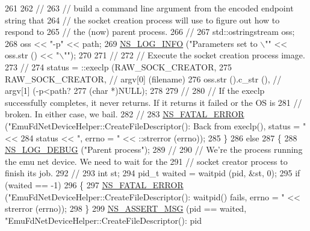 \begin{DoxyCode}
261 
262       \textcolor{comment}{//}
263       \textcolor{comment}{// build a command line argument from the encoded endpoint string that}
264       \textcolor{comment}{// the socket creation process will use to figure out how to respond to}
265       \textcolor{comment}{// the (now) parent process.}
266       \textcolor{comment}{//}
267       std::ostringstream oss;
268       oss << \textcolor{stringliteral}{"-p"} << path;
269       \hyperlink{group__logging_gafbd73ee2cf9f26b319f49086d8e860fb}{NS\_LOG\_INFO} (\textcolor{stringliteral}{"Parameters set to \(\backslash\)""} << oss.str () << \textcolor{stringliteral}{"\(\backslash\)""});
270 
271       \textcolor{comment}{//}
272       \textcolor{comment}{// Execute the socket creation process image.}
273       \textcolor{comment}{//}
274       status = ::execlp (RAW\_SOCK\_CREATOR,
275                          RAW\_SOCK\_CREATOR,                            \textcolor{comment}{// argv[0] (filename)}
276                          oss.str ().c\_str (),                           \textcolor{comment}{// argv[1] (-p<path?}
277                          (\textcolor{keywordtype}{char} *)NULL);
278 
279       \textcolor{comment}{//}
280       \textcolor{comment}{// If the execlp successfully completes, it never returns.  If it returns it failed or the OS is}
281       \textcolor{comment}{// broken.  In either case, we bail.}
282       \textcolor{comment}{//}
283       \hyperlink{group__fatal_ga5131d5e3f75d7d4cbfd706ac456fdc85}{NS\_FATAL\_ERROR} (\textcolor{stringliteral}{"EmuFdNetDeviceHelper::CreateFileDescriptor(): Back from execlp(),
       status = "} <<
284                       status << \textcolor{stringliteral}{", errno = "} << ::strerror (errno));
285     \}
286   \textcolor{keywordflow}{else}
287     \{
288       \hyperlink{group__logging_ga413f1886406d49f59a6a0a89b77b4d0a}{NS\_LOG\_DEBUG} (\textcolor{stringliteral}{"Parent process"});
289       \textcolor{comment}{//}
290       \textcolor{comment}{// We're the process running the emu net device.  We need to wait for the}
291       \textcolor{comment}{// socket creator process to finish its job.}
292       \textcolor{comment}{//}
293       \textcolor{keywordtype}{int} st;
294       pid\_t waited = waitpid (pid, &st, 0);
295       \textcolor{keywordflow}{if} (waited == -1)
296         \{
297           \hyperlink{group__fatal_ga5131d5e3f75d7d4cbfd706ac456fdc85}{NS\_FATAL\_ERROR} (\textcolor{stringliteral}{"EmuFdNetDeviceHelper::CreateFileDescriptor(): waitpid() fails,
       errno = "} << strerror (errno));
298         \}
299       \hyperlink{assert_8h_aff5ece9066c74e681e74999856f08539}{NS\_ASSERT\_MSG} (pid == waited, \textcolor{stringliteral}{"EmuFdNetDeviceHelper::CreateFileDescriptor(): pid
}
\end{DoxyCode}
